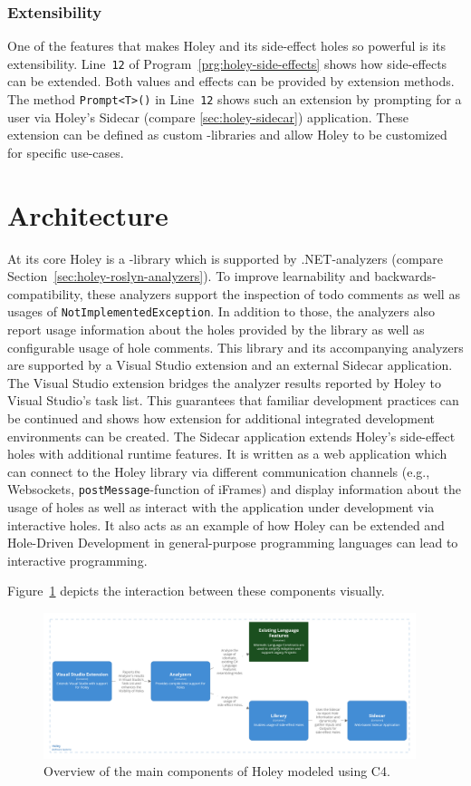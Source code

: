 \subsubsection{Extensibility}
One of the features that makes Holey and its side-effect holes so powerful is its extensibility.
Line~\verb|12| of Program~\ref{prg:holey-side-effects} shows how side-effects can be extended.
Both values and effects can be provided by extension methods.
The method \verb|Prompt<T>()| in Line~\verb|12| shows such an extension by prompting for a user via Holey's Sidecar (compare \ref{sec:holey-sidecar}) application.
These extension can be defined as custom \CS-libraries and allow Holey to be customized for specific use-cases.


\section{Architecture}
\label{sec:holey-architecture}
At its core Holey is a \CS-library which is supported by .NET-analyzers (compare Section~\ref{sec:holey-roslyn-analyzers}).
To improve learnability and backwards-compatibility, these analyzers support the inspection of todo comments as well as usages of \verb|NotImplementedException|.
In addition to those, the analyzers also report usage information about the holes provided by the library as well as configurable usage of hole comments.
This library and its accompanying analyzers are supported by a Visual Studio extension and an external Sidecar application.
The Visual Studio extension bridges the analyzer results reported by Holey to Visual Studio's task list.
This guarantees that familiar development practices can be continued and shows how extension for additional integrated development environments can be created.
The Sidecar application extends Holey's side-effect holes with additional runtime features.
It is written as a web application which can connect to the Holey library via different communication channels (e.g., Websockets, \verb|postMessage|-function of iFrames) and display information about the usage of holes as well as interact with the application under development via interactive holes.
It also acts as an example of how Holey can be extended and Hole-Driven Development in general-purpose programming languages can lead to interactive programming.

Figure~\ref{fig:holey-architecture} depicts the interaction between these components visually.
\begin{figure}[ht]
    \centering
    \includegraphics[width=0.97\textwidth]{images/holey-architecture}
    \caption{Overview of the main components of Holey modeled using C4.}
    \label{fig:holey-architecture}
\end{figure}

